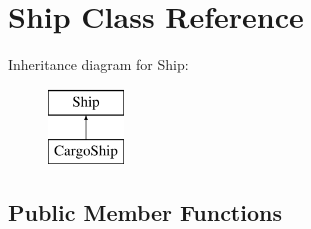 \hypertarget{class_ship}{}\section{Ship Class Reference}
\label{class_ship}
Inheritance diagram for Ship\+:\begin{figure}[H]
\begin{center}
\leavevmode
\includegraphics[height=2.000000cm]{class_ship}
\end{center}
\end{figure}
\subsection*{Public Member Functions}
